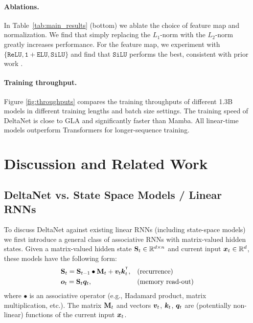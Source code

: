 \paragraph{Ablations.}
In Table~\ref{tab:main_results} (bottom) we ablate the choice of feature map and  normalization.
We find that simply replacing the $L_1$-norm with the $L_2$-norm greatly increases performance. 
For the feature map, we experiment with $\{\mathtt{ReLU}, \mathtt{1+ELU}, \mathtt{SiLU}\}$ and find that $\mathtt{SiLU}$ performs the best, consistent 
 with prior work \cite{qin2023scaling}.

\vspace{-2mm}
 
\paragraph{Training throughput.}
Figure \ref{fig:throughputs} compares the training throughputs of different 1.3B models in different training lengths and batch size settings. 
The training speed of DeltaNet is close to GLA and significantly faster than Mamba.  
All linear-time models outperform Transformers for longer-sequence training.





\vspace{-2mm}
\section{Discussion and Related Work}
\vspace{-2mm}
\subsection{DeltaNet vs. State Space Models / Linear RNNs}
\vspace{-2mm}
To discuss DeltaNet against existing linear RNNs (including state-space models) we first introduce a general class of associative RNNs with matrix-valued hidden states. Given a matrix-valued hidden state ${\mathbf{S}}_t \in \mathbb{R}^{d \times n}$ and current input ${\bm{x}}_t \in \mathbb{R}^{d}$, these models have the following form:
\begin{align*}
    &\rmS_t =   \rmS_{t-1} \bullet \rmM_t  + \vv_t  \vk_t^\intercal, &&  \text{(recurrence)} \\ &\vo_t = \rmS_t \vq_t,  &&  \text{(memory read-out)} 
\end{align*}
where $\bullet$ is an associative operator (e.g., Hadamard product, matrix multiplication, etc.). The matrix ${\mathbf{M}}_t$ and vectors ${\bm{v}}_t$, ${\bm{k}}_t$, ${\bm{q}}_t$  are (potentially non-linear) functions of the current input ${\bm{x}}_t$. 


